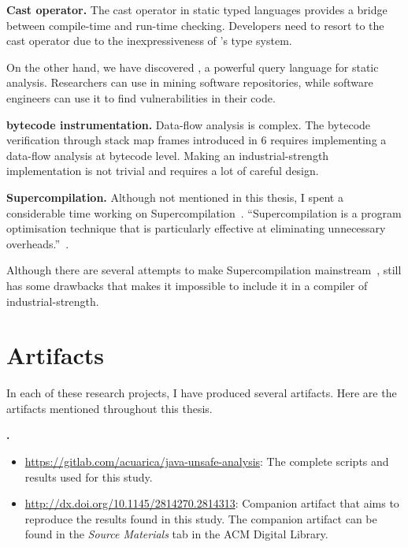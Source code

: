 \textbf{Cast operator.}
The cast operator in static typed languages provides a bridge between compile-time and run-time checking.
Developers need to resort to the cast operator due to the inexpressiveness of \java{}'s type system. 

On the other hand, we have discovered \ql{},
a powerful query language for static analysis.
Researchers can use \ql{} in mining software repositories,
while software engineers can use it to find vulnerabilities in their code.

\textbf{\java{} bytecode instrumentation.}
Data-flow analysis is complex.
The bytecode verification through stack map frames introduced in \java{} 6 requires implementing a data-flow analysis at bytecode level.
Making an industrial-strength implementation is not trivial
and requires a lot of careful design.

\textbf{Supercompilation.}
Although not mentioned in this thesis,
I spent a considerable time working on Supercompilation~\citep{turchinConceptSupercompiler1986}.
``Supercompilation is a program optimisation technique that is particularly effective at eliminating unnecessary overheads.''~\citep{mitchellRethinkingSupercompilation2010}.

Although there are several attempts to make Supercompilation mainstream~\citep{mitchellSupercompilerCoreHaskell2007,bolingbrokeSupercompilationEvaluation2010},
still has some drawbacks that makes it impossible to include it in a compiler of industrial-strength.


\section{Artifacts}
\newcommand{\urlartifact}[2]{\item{\footnotesize\url{#1}}: #2}

In each of these research projects,
I have produced several artifacts.
Here are the artifacts mentioned throughout this thesis.

\textbf{\unsafe{} \api{}.}
\begin{itemize}
\urlartifact{https://gitlab.com/acuarica/java-unsafe-analysis}{The complete scripts and results used for this study.}
\urlartifact{http://dx.doi.org/10.1145/2814270.2814313}{Companion artifact that aims to reproduce the results found in this study.
The companion artifact can be found in the \emph{Source Materials} tab in the ACM Digital Library.}
\end{itemize}

